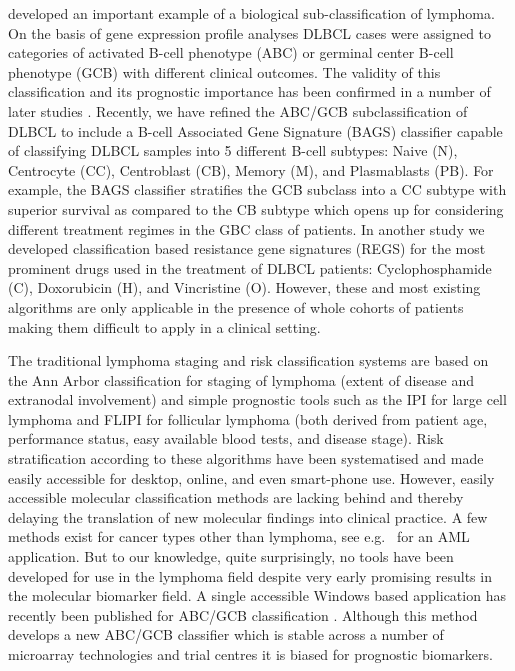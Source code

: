 \documentclass{article}
\begin{document}
\citet{Alizadeh2000} developed an important example of a biological sub-classification of lymphoma.
On the basis of gene expression profile analyses DLBCL cases were assigned to categories of activated B-cell phenotype (ABC) or germinal center B-cell phenotype (GCB) with different clinical outcomes.
The validity of this classification and its prognostic importance has been confirmed in a number of later studies \citep{Rosenwald2002a,Hans2004,Lenz2008a,Monti2012a}.
Recently, we have refined the ABC/GCB subclassification of DLBCL to include a B-cell Associated Gene Signature (BAGS) classifier capable of classifying DLBCL samples into 5 different B-cell subtypes: Naive (N), Centrocyte (CC), Centroblast (CB), Memory (M), and Plasmablasts (PB).
For example, the BAGS classifier stratifies the GCB subclass into a CC subtype with superior survival as compared to the CB subtype \citep{Dybkaer2013} which opens up for considering different treatment regimes in the GBC class of patients.
In another study \citep{Falgreen2013c} we developed classification based resistance gene signatures (REGS) for the most prominent drugs used in the treatment of DLBCL patients: Cyclophosphamide (C), Doxorubicin (H), and Vincristine (O).
However, these and most existing algorithms are only applicable in the presence of whole cohorts of patients making them difficult to apply in a clinical setting.

The traditional lymphoma staging and risk classification systems are based on the Ann Arbor classification for staging of lymphoma (extent of disease and extranodal involvement) and simple prognostic tools such as the IPI for large cell lymphoma and FLIPI for follicular lymphoma (both derived from patient age, performance status, easy available blood tests, and disease stage).
Risk stratification according to these algorithms have been systematised and made easily accessible for desktop, online, and even smart-phone use.
However, easily accessible molecular classification methods are lacking behind and thereby delaying the translation of new molecular findings into clinical practice.
A few methods exist for cancer types other than lymphoma, see e.g.\ \citep{Huang2009} for an AML application.
But to our knowledge, quite surprisingly, no tools have been developed for use in the lymphoma field despite very early promising results in the molecular biomarker field.
A single accessible Windows based application has recently been published for ABC/GCB classification \citep{Care2013}.
Although this method develops a new ABC/GCB classifier which is stable across a number of microarray technologies and trial centres it is biased for prognostic biomarkers.
\end{document}
